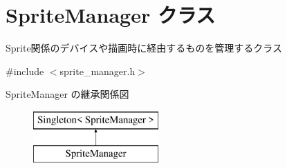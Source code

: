 \hypertarget{class_sprite_manager}{}\section{Sprite\+Manager クラス}
\label{class_sprite_manager}


Sprite関係のデバイスや描画時に経由するものを管理するクラス  




{\ttfamily \#include $<$sprite\+\_\+manager.\+h$>$}

Sprite\+Manager の継承関係図\begin{figure}[H]
\begin{center}
\leavevmode
\includegraphics[height=2.000000cm]{class_sprite_manager}
\end{center}
\end{figure}
